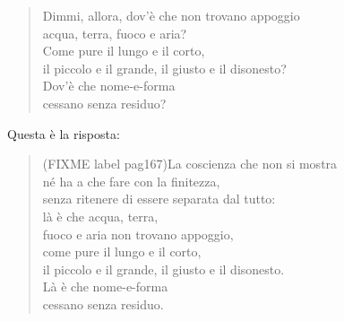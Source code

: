 \begin{quote}
Dimmi, allora, dov’è che non trovano appoggio \\
acqua, terra, fuoco e aria? \\
Come pure il lungo e il corto, \\
il piccolo e il grande, il giusto e il disonesto? \\
Dov’è che nome-e-forma \\
cessano senza residuo?
\end{quote}

Questa è la risposta:


\begin{quote}
(FIXME label pag167)La coscienza che non si mostra \\
né ha a che fare con la finitezza, \\
senza ritenere di essere separata dal tutto: \\
là è che acqua, terra, \\
fuoco e aria non trovano appoggio, \\
come pure il lungo e il corto, \\
il piccolo e il grande, il giusto e il disonesto. \\
Là è che nome-e-forma \\
cessano senza residuo.
\end{quote}



